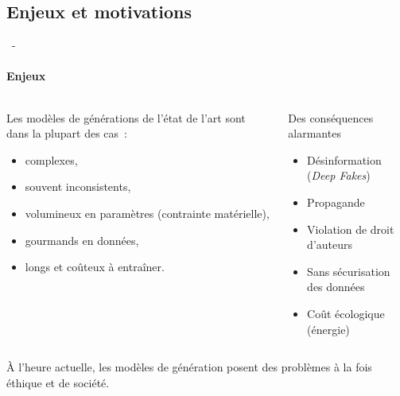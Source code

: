 \documentclass[aspectratio=169, 22pt]{beamer}
\begin{document}
\subsection{Enjeux et motivations}
\begin{frame}{\secname~- \subsecname}
  \framesubtitle{Enjeux}
  \begin{columns}
    \begin{column}{0.5\linewidth}
      Les modèles de générations de l'état de l'art sont dans la plupart des cas~:
      \begin{itemize}
      \item complexes,
      \item souvent inconsistents,
      \item volumineux en paramètres (contrainte matérielle),
      \item gourmands en données,
      \item longs et coûteux à entraîner.
      \end{itemize}
    \end{column}
    \begin{column}{0.5\linewidth}
      \begin{alertblock}{Des conséquences alarmantes}
      \begin{itemize}
      \item Désinformation (\emph{Deep Fakes})
      \item Propagande
      \item Violation de droit d'auteurs
      \item Sans sécurisation des données
      \item Coût écologique (énergie)
      \end{itemize}        
      \end{alertblock}
    \end{column}
  \end{columns}

  \vfill
  \begin{exampleblock}{}
    \centering
  À l'heure actuelle, les modèles de génération posent des
  \alert{problèmes} à la fois \alert{éthique} et \alert{de société}.
  \end{exampleblock}
\end{frame}
\end{document}

